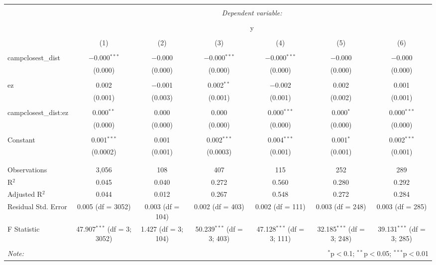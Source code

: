 
\begin{table}[!htbp] \centering 
  \caption{} 
  \label{} 
\begin{tabular}{lcccccc} 
\\[-1.8ex]\hline 
\hline \\[-1.8ex] 
 & \multicolumn{6}{c}{\textit{Dependent variable:}} \\ 
\cline{2-7} 
\\[-1.8ex] & \multicolumn{6}{c}{y} \\ 
\\[-1.8ex] & (1) & (2) & (3) & (4) & (5) & (6)\\ 
\hline \\[-1.8ex] 
 campclosest\_dist & $-$0.000$^{***}$ & $-$0.000 & $-$0.000$^{***}$ & $-$0.000$^{***}$ & $-$0.000 & $-$0.000 \\ 
  & (0.000) & (0.000) & (0.000) & (0.000) & (0.000) & (0.000) \\ 
  & & & & & & \\ 
 ez & 0.002 & $-$0.001 & 0.002$^{**}$ & $-$0.002 & 0.002 & 0.001 \\ 
  & (0.001) & (0.003) & (0.001) & (0.001) & (0.002) & (0.001) \\ 
  & & & & & & \\ 
 campclosest\_dist:ez & 0.000$^{**}$ & 0.000 & 0.000 & 0.000$^{***}$ & 0.000$^{*}$ & 0.000$^{***}$ \\ 
  & (0.000) & (0.000) & (0.000) & (0.000) & (0.000) & (0.000) \\ 
  & & & & & & \\ 
 Constant & 0.001$^{***}$ & 0.001 & 0.002$^{***}$ & 0.004$^{***}$ & 0.001$^{*}$ & 0.002$^{***}$ \\ 
  & (0.0002) & (0.001) & (0.0003) & (0.001) & (0.001) & (0.001) \\ 
  & & & & & & \\ 
\hline \\[-1.8ex] 
Observations & 3,056 & 108 & 407 & 115 & 252 & 289 \\ 
R$^{2}$ & 0.045 & 0.040 & 0.272 & 0.560 & 0.280 & 0.292 \\ 
Adjusted R$^{2}$ & 0.044 & 0.012 & 0.267 & 0.548 & 0.272 & 0.284 \\ 
Residual Std. Error & 0.005 (df = 3052) & 0.003 (df = 104) & 0.002 (df = 403) & 0.002 (df = 111) & 0.003 (df = 248) & 0.003 (df = 285) \\ 
F Statistic & 47.907$^{***}$ (df = 3; 3052) & 1.427 (df = 3; 104) & 50.239$^{***}$ (df = 3; 403) & 47.128$^{***}$ (df = 3; 111) & 32.185$^{***}$ (df = 3; 248) & 39.131$^{***}$ (df = 3; 285) \\ 
\hline 
\hline \\[-1.8ex] 
\textit{Note:}  & \multicolumn{6}{r}{$^{*}$p$<$0.1; $^{**}$p$<$0.05; $^{***}$p$<$0.01} \\ 
\end{tabular} 
\end{table} 
